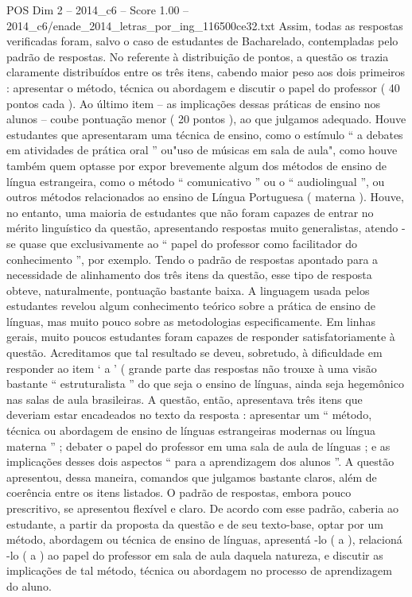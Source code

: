 \begin{textsample}{POS Dim 2 – 2014\_c6 – Score 1.00 – 2014\_c6/enade\_2014\_letras\_por\_ing\_116500ce32.txt}
Assim, todas as respostas verificadas foram, salvo o caso de estudantes de Bacharelado, contempladas pelo padrão de respostas.
No referente à distribuição de pontos, a questão os trazia claramente distribuídos entre os três itens, cabendo maior peso aos dois primeiros : apresentar o método, técnica ou abordagem e discutir o papel do professor ( 40 pontos cada ).
Ao último item – as implicações dessas práticas de ensino nos alunos – coube pontuação menor ( 20 pontos ), ao que julgamos adequado.
Houve estudantes que apresentaram uma técnica de ensino, como o estímulo “ a debates em atividades de prática oral ” ou"uso de músicas em sala de aula", como houve também quem optasse por expor brevemente algum dos métodos de ensino de língua estrangeira, como o método “ comunicativo ” ou o “ audiolingual ”, ou outros métodos relacionados ao ensino de Língua Portuguesa ( materna ).
Houve, no entanto, uma maioria de estudantes que não foram capazes de entrar no mérito linguístico da questão, apresentando respostas muito generalistas, atendo -se quase que exclusivamente ao “ papel do professor como facilitador do conhecimento ”, por exemplo.
Tendo o padrão de respostas apontado para a necessidade de alinhamento dos três itens da questão, esse tipo de resposta obteve, naturalmente, pontuação bastante baixa.
A linguagem usada pelos estudantes revelou algum conhecimento teórico sobre a prática de ensino de línguas, mas muito pouco sobre as metodologias especificamente.
Em linhas gerais, muito poucos estudantes foram capazes de responder satisfatoriamente à questão.
Acreditamos que tal resultado se deveu, sobretudo, à dificuldade em responder ao item ‘ a ’ ( grande parte das respostas não trouxe à uma visão bastante “ estruturalista ” do que seja o ensino de línguas, ainda seja hegemônico nas salas de aula brasileiras.
A questão, então, apresentava três itens que deveriam estar encadeados no texto da resposta : apresentar um “ método, técnica ou abordagem de ensino de línguas estrangeiras modernas ou língua materna ” ; debater o papel do professor em uma sala de aula de línguas ; e as implicações desses dois aspectos “ para a aprendizagem dos alunos ”.
A questão apresentou, dessa maneira, comandos que julgamos bastante claros, além de coerência entre os itens listados.
O padrão de respostas, embora pouco prescritivo, se apresentou flexível e claro.
De acordo com esse padrão, caberia ao estudante, a partir da proposta da questão e de seu texto-base, optar por um método, abordagem ou técnica de ensino de línguas, apresentá -lo ( a ), relacioná -lo ( a ) ao papel do professor em sala de aula daquela natureza, e discutir as implicações de tal método, técnica ou abordagem no processo de aprendizagem do aluno.

\end{textsample}
